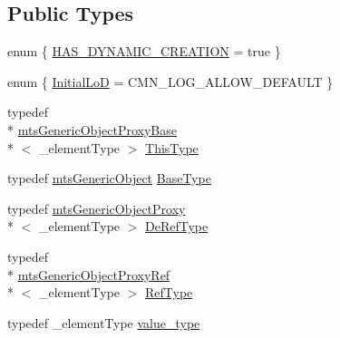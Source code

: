 \subsection*{Public Types}
\begin{DoxyCompactItemize}
\item 
enum \{ \hyperlink{classmts_generic_object_proxy_base_ab810b441034523273eacb49c5d980762acdf8d979b924886946ce75d2d6b49acf}{H\-A\-S\-\_\-\-D\-Y\-N\-A\-M\-I\-C\-\_\-\-C\-R\-E\-A\-T\-I\-O\-N} = true
 \}
\item 
enum \{ \hyperlink{classmts_generic_object_proxy_base_af4153adc27d47e960ab113e4ae59ac79a65ac8d6bdefc9e15df73a3fde47083dd}{Initial\-Lo\-D} = C\-M\-N\-\_\-\-L\-O\-G\-\_\-\-A\-L\-L\-O\-W\-\_\-\-D\-E\-F\-A\-U\-L\-T
 \}
\item 
typedef \\*
\hyperlink{classmts_generic_object_proxy_base}{mts\-Generic\-Object\-Proxy\-Base}\\*
$<$ \-\_\-element\-Type $>$ \hyperlink{classmts_generic_object_proxy_base_adfa837044848485e7241e56816a74083}{This\-Type}
\item 
typedef \hyperlink{classmts_generic_object}{mts\-Generic\-Object} \hyperlink{classmts_generic_object_proxy_base_a61a6c330998d8ba0923ff57f0a30b81e}{Base\-Type}
\item 
typedef \hyperlink{classmts_generic_object_proxy}{mts\-Generic\-Object\-Proxy}\\*
$<$ \-\_\-element\-Type $>$ \hyperlink{classmts_generic_object_proxy_base_ac87827bf98fee558160a8985c41f4126}{De\-Ref\-Type}
\item 
typedef \\*
\hyperlink{classmts_generic_object_proxy_ref}{mts\-Generic\-Object\-Proxy\-Ref}\\*
$<$ \-\_\-element\-Type $>$ \hyperlink{classmts_generic_object_proxy_base_adddd01c8aea004bf5f0a5894438970c9}{Ref\-Type}
\item 
typedef \-\_\-element\-Type \hyperlink{classmts_generic_object_proxy_base_a82246d737da0e0bfb1710f63f6afa34b}{value\-\_\-type}
\end{DoxyCompactItemize}
